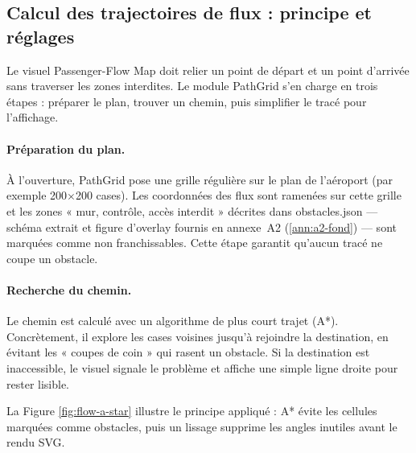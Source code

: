 \subsection{Calcul des trajectoires de flux : principe et réglages}
\label{subsec:4A-layout}



Le visuel Passenger\nobreakdash-Flow Map doit relier un point de départ et un point d’arrivée sans traverser les zones interdites. Le module PathGrid s’en charge en trois étapes : préparer le plan, trouver un chemin, puis simplifier le tracé pour l’affichage.

\paragraph{Préparation du plan.}
À l’ouverture, PathGrid pose une grille régulière sur le plan de l’aéroport (par exemple 200$\times$200 cases). Les coordonnées des flux sont ramenées sur cette grille et les zones « mur, contrôle, accès interdit » décrites dans obstacles.json — schéma extrait et figure d’overlay fournis en annexe~A2 (\autoref{ann:a2-fond}) — sont marquées comme non franchissables. Cette étape garantit qu’aucun tracé ne coupe un obstacle.

\paragraph{Recherche du chemin.}
Le chemin est calculé avec un algorithme de plus court trajet (A*). Concrètement, il explore les cases voisines jusqu’à rejoindre la destination, en évitant les « coupes de coin » qui rasent un obstacle. Si la destination est inaccessible, le visuel signale le problème et affiche une simple ligne droite pour rester lisible.

La Figure \ref{fig:flow-a-star} illustre le principe appliqué : A* évite les cellules marquées comme obstacles, puis un lissage supprime les angles inutiles avant le rendu SVG.


